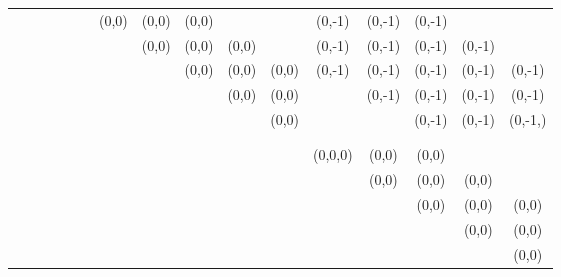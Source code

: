 \documentclass{article}
\begin{document}
\begin{sidewaystable}
{\begin{tabular}{ccc|ccc||ccccc|ccccc}
&&&&&& (0,0) & \color{red}(0,0) & \color{blue}(0,0) & & & (0,-1) & \color{red}(0,-1) & \color{blue}(0,-1) & & \\
&&&&&&& (0,0) & \color{red}(0,0) & \color{blue}(0,0) & & \color{zgreen}(0,-1) & (0,-1) & \color{red}(0,-1) & \color{blue}(0,-1) & \\
&&&&&&&& (0,0) & \color{red}(0,0) & \color{blue}(0,0) & \color{purple}(0,-1) & \color{zgreen}(0,-1) & (0,-1) & \color{red}(0,-1) & \color{blue}(0,-1) \\
&&&&&&&&& (0,0) & \color{red}(0,0) & & \color{purple}(0,-1) & \color{zgreen}(0,-1) & (0,-1) & \color{red}(0,-1) \\
&&&&&&&&&& (0,0) & & & \color{purple}(0,-1) & (0,-1) & (0,-1,) \\
&&&&&&&&&&&&&&&\\
\hline
&&&&&&&&&&&&&&&\\
&&&&&&&&&&& (0,0,0) & \color{red}(0,0) & \color{blue}(0,0) & & \\
&&&&&&&&&&&& (0,0) & \color{red}(0,0) & \color{blue}(0,0) & \\
&&&&&&&&&&&&& (0,0) & \color{red}(0,0) & \color{blue}(0,0) \\
&&&&&&&&&&&&&& (0,0) & \color{red}(0,0) \\
&&&&&&&&&&&&&&& (0,0) \\
\end{tabular}
}
\end{sidewaystable}
\end{document}
